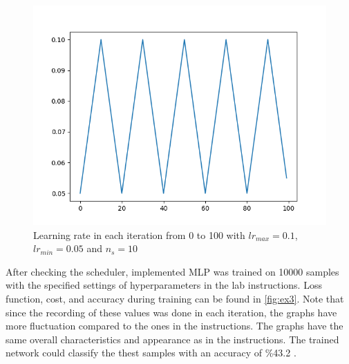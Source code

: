 \documentclass[a4paper]{article}
\begin{document}
\begin{figure}[h]
	\centering
	\includegraphics[width=0.5\linewidth]{images/scheduler.png}
	\caption{Learning rate in each iteration from 0 to 100 with $lr_{max}=0.1$, $lr_{min}=0.05$ and $n_s=10$}
	\label{fig:cycle}
\end{figure}

After checking the scheduler, implemented MLP was trained on 10000 samples with the specified settings of hyperparameters in the lab instructions. Loss function, cost, and accuracy during training can be found in \autoref{fig:ex3}. Note that since the recording of these values was done in each iteration, the graphs have more fluctuation compared to the ones in the instructions.  The graphs have the same overall characteristics and appearance as in the instructions. The trained network could classify the thest samples with an accuracy of \%43.2 .
\end{document}
